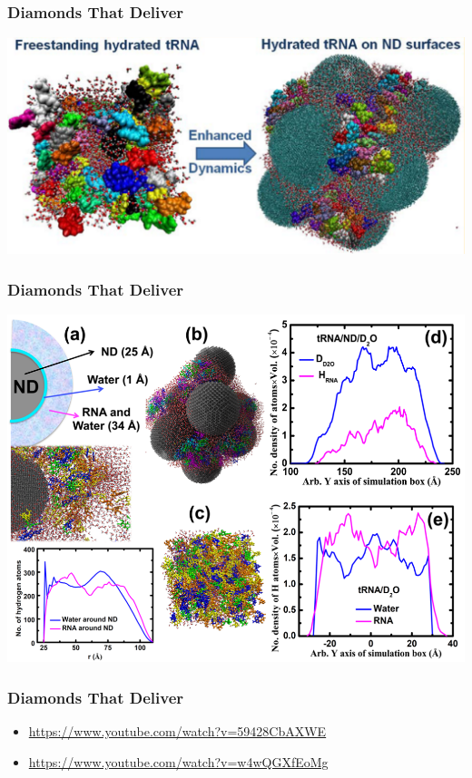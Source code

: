 \begin{frame}
\frametitle{Diamonds That Deliver}
\center\includegraphics[width=\textwidth]{hydrated_tRNA.png}
\end{frame}

\begin{frame}
\frametitle{Diamonds That Deliver}
\center\includegraphics[width=\textwidth]{tRNA_analysis.png}
\end{frame}

\begin{frame}
\frametitle{Diamonds That Deliver}
    \begin{itemize}
        \item
        \href{https://www.youtube.com/watch?v=59428CbAXWE}{https://www.youtube.com/watch?v=59428CbAXWE}
        \item
        \href{https://www.youtube.com/watch?v=w4wQGXfEoMg}{https://www.youtube.com/watch?v=w4wQGXfEoMg}
    \end{itemize}
\end{frame}

